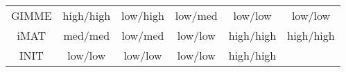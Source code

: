 \documentclass[12pt,twoside,openany,\mydriver]{thesis}  %
\begin{document}
\begin{longtable}[]{@{}cccccc@{}}
\begin{minipage}[t]{0.10\columnwidth}
GIMME\strut
\end{minipage} & \begin{minipage}[t]{0.12\columnwidth}\centering
high/high\strut
\end{minipage} & \begin{minipage}[t]{0.18\columnwidth}\centering
low/high\strut
\end{minipage} & \begin{minipage}[t]{0.13\columnwidth}\centering
low/med\strut
\end{minipage} & \begin{minipage}[t]{0.19\columnwidth}\centering
low/low\strut
\end{minipage} & \begin{minipage}[t]{0.11\columnwidth}\centering
low/low\strut
\end{minipage}\tabularnewline
\begin{minipage}[t]{0.10\columnwidth}\centering
iMAT\strut
\end{minipage} & \begin{minipage}[t]{0.12\columnwidth}\centering
med/med\strut
\end{minipage} & \begin{minipage}[t]{0.18\columnwidth}\centering
low/med\strut
\end{minipage} & \begin{minipage}[t]{0.13\columnwidth}\centering
low/low\strut
\end{minipage} & \begin{minipage}[t]{0.19\columnwidth}\centering
high/high\strut
\end{minipage} & \begin{minipage}[t]{0.11\columnwidth}\centering
high/high\strut
\end{minipage}\tabularnewline
\begin{minipage}[t]{0.10\columnwidth}\centering
INIT\strut
\end{minipage} & \begin{minipage}[t]{0.12\columnwidth}\centering
low/low\strut
\end{minipage} & \begin{minipage}[t]{0.18\columnwidth}\centering
low/low\strut
\end{minipage} & \begin{minipage}[t]{0.13\columnwidth}\centering
low/low\strut
\end{minipage} & \begin{minipage}[t]{0.19\columnwidth}\centering
high/high\strut
\end{minipage} & \begin{minipage}[t]{0.11\columnwidth}\centering

\end{minipage}
\end{longtable}
\end{document}
